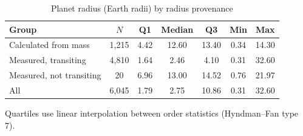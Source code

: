 \begin{table}[t]
\centering
\begin{threeparttable}
\caption{Planet radius (Earth radii) by radius provenance}
\label{tab:radius_stats}
\begin{tabular}{lcccccc}
\toprule
Group & $N$ & Q1 & Median & Q3 & Min & Max \\
\midrule
Calculated from mass & 1,215 & 4.42 & 12.60 & 13.40 & 0.34 & 14.30 \\
Measured, transiting & 4,810 & 1.64 & 2.46 & 4.10 & 0.31 & 32.60 \\
Measured, not transiting & 20 & 6.96 & 13.00 & 14.52 & 0.76 & 21.97 \\
All & 6,045 & 1.79 & 2.75 & 10.86 & 0.31 & 32.60 \\
\bottomrule
\end{tabular}
\begin{tablenotes}[flushleft]
\footnotesize
\item Quartiles use linear interpolation between order statistics (Hyndman--Fan type 7).
\end{tablenotes}
\end{threeparttable}
\end{table}
